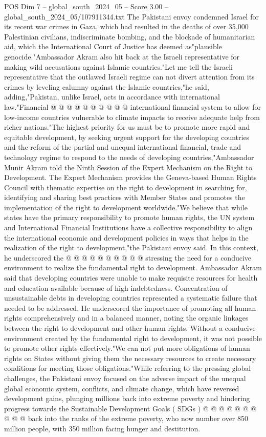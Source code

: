 \begin{textsample}{POS Dim 7 – global\_south\_2024\_05 – Score 3.00 – global\_south\_2024\_05/107911344.txt}
The Pakistani envoy condemned Israel for its recent war crimes in Gaza, which had resulted in the deaths of over 35,000 Palestinian civilians, indiscriminate bombing, and the blockade of humanitarian aid, which the International Court of Justice has deemed as"plausible genocide."Ambassador Akram also hit back at the Israeli representative for making wild accusations against Islamic countries."Let me tell the Israeli representative that the outlawed Israeli regime can not divert attention from its crimes by leveling calumny against the Islamic countries,"he said, adding,"Pakistan, unlike Israel, acts in accordance with international law."Financial @ @ @ @ @ @ @ @ @ @ international financial system to allow for low-income countries vulnerable to climate impacts to receive adequate help from richer nations."The highest priority for us must be to promote more rapid and equitable development, by seeking urgent support for the developing countries and the reform of the partial and unequal international financial, trade and technology regime to respond to the needs of developing countries,"Ambassador Munir Akram told the Ninth Session of the Expert Mechanism on the Right to Development.
The Expert Mechanism provides the Geneva-based Human Rights Council with thematic expertise on the right to development in searching for, identifying and sharing best practices with Member States and promotes the implementation of the right to development worldwide."We believe that while states have the primary responsibility to promote human rights, the UN system and International Financial Institutions have a collective responsibility to align the international economic and development policies in ways that helps in the realization of the right to development,"the Pakistani envoy said.
In this context, he underscored the @ @ @ @ @ @ @ @ @ @ stressing the need for a conducive environment to realize the fundamental right to development.
Ambassador Akram said that developing countries were unable to make requisite resources for health and education available because of high indebtedness.
Concentration of unsustainable debts in developing countries represented a systematic failure that needed to be addressed.
He underscored the importance of promoting all human rights comprehensively and in a balanced manner, noting the organic linkages between the right to development and other human rights.
Without a conducive environment created by the fundamental right to development, it was not possible to promote other rights effectively."We can not put more obligations of human rights on States without giving them the necessary resources to create necessary conditions for meeting those obligations."While referring to the pressing global challenges, the Pakistani envoy focused on the adverse impact of the unequal global economic system, conflicts, and climate change, which have reversed development gains, plunging millions back into extreme poverty and hindering progress towards the Sustainable Development Goals ( SDGs ) @ @ @ @ @ @ @ @ @ @ back into the ranks of the extreme poverty, who now number over 850 million people, with 350 million facing hunger and destitution.

\end{textsample}
